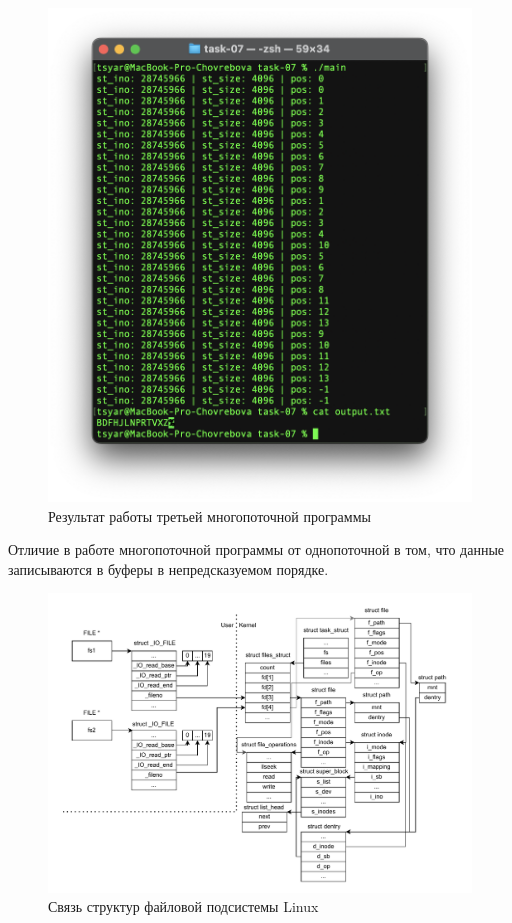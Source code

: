 \begin{figure}[h!] 
	\centering
	\includegraphics[width=1.0\textwidth]{./img/third-02.png}
	\caption{Результат работы третьей многопоточной программы}
	\label{fig:2222}
\end{figure}

Отличие в работе многопоточной программы от однопоточной в том, что данные записываются в буферы в непредсказуемом порядке.

\begin{figure}[h!] 
	\centering
	\includegraphics[width=1.1\textwidth]{./img/third.pdf}
	\caption{Связь структур файловой подсистемы Linux}
	\label{fig:323}
\end{figure}
\newpage

